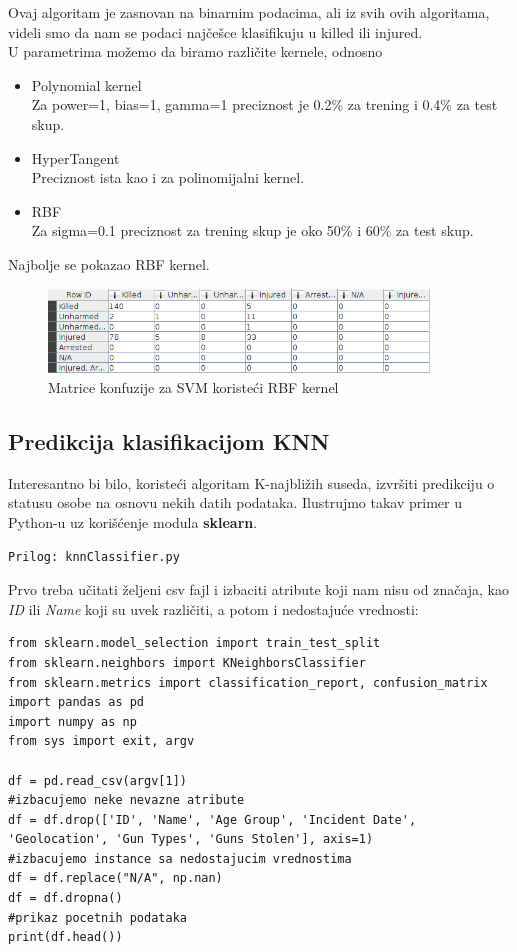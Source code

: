\documentclass[12pt, a4paper]{article}
\begin{document}
Ovaj algoritam je zasnovan na binarnim podacima,
ali iz svih ovih algoritama, videli smo da nam se podaci naj\v ce\v sce klasifikuju u killed ili injured. \\

U parametrima mo\v zemo da biramo razli\v cite kernele, odnosno
\begin{itemize}
\item Polynomial kernel\\
Za power=1, bias=1, gamma=1 preciznost je 0.2\% za trening i 0.4\% za test skup.  
\item HyperTangent\\
Preciznost ista kao i za polinomijalni kernel.
\item RBF\\
Za sigma=0.1 preciznost za trening skup je oko 50\% i 60\% za test skup.  
\end{itemize}
  
Najbolje se pokazao RBF kernel.

\begin{figure}[H]
\centering
\includegraphics[width=0.9\textwidth]{svm_confussionMatrix_childrenKI.png}
\caption{Matrice konfuzije za SVM koriste\' ci RBF kernel}
\end{figure}


\newpage
\subsection{Predikcija klasifikacijom KNN}
Interesantno bi bilo, koriste\' ci algoritam K-najbli\v zih suseda, izvr\v siti predikciju o statusu osobe na osnovu nekih datih podataka. Ilustrujmo takav primer u Python-u uz kori\v s\' cenje modula \textbf{sklearn}.

\begin{verbatim}
Prilog: knnClassifier.py
\end{verbatim}

Prvo treba u\v citati \v zeljeni csv fajl i izbaciti atribute koji nam nisu od zna\v caja, kao \textit{ID} ili \textit{Name} koji su uvek razli\v citi, a potom i nedostaju\' ce vrednosti:

\begin{lstlisting}
from sklearn.model_selection import train_test_split
from sklearn.neighbors import KNeighborsClassifier
from sklearn.metrics import classification_report, confusion_matrix
import pandas as pd
import numpy as np
from sys import exit, argv

df = pd.read_csv(argv[1])
#izbacujemo neke nevazne atribute
df = df.drop(['ID', 'Name', 'Age Group', 'Incident Date', 'Geolocation', 'Gun Types', 'Guns Stolen'], axis=1)
#izbacujemo instance sa nedostajucim vrednostima
df = df.replace("N/A", np.nan)
df = df.dropna()
#prikaz pocetnih podataka
print(df.head())
\end{lstlisting}
\end{document}
